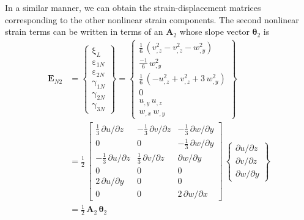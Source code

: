 In a similar manner, we can obtain the strain-displacement matrices corresponding to the other nonlinear strain components. The second nonlinear strain terms can be written in terms of an $\mathbf{A}_2$ whose slope vector $\boldsymbol{\theta}_2$ is
\begin{equation}
\begin{aligned}
\mathbf{E}_{N2} & =  \begin{Bmatrix}
\mathrm \xi_{L} \\
\mathrm \varepsilon_{1N} \\
\mathrm \varepsilon_{2N} \\
\mathrm \gamma_{1N} \\
\mathrm \gamma_{2N} \\
\mathrm \gamma_{3N} \end{Bmatrix} =
\begin{Bmatrix}
\tfrac{1}{6} \,  \left( v_{,z}^2 - v_{,z}^2 - w_{,y}^2  \right)\\
\tfrac{-1}{6} \, w_{,y}^2 \\
\tfrac{1}{6} \,  \left( - u_{,z}^2  + v_{,z}^2 + 3 \, w_{,y}^2 \right) \\
0 \\
u_{,y} \, u_{,z}  \\ 
w_{,x} \, w_{,y} \end{Bmatrix} \\
& = \frac{1}{2} \, \begin{bmatrix}
 \tfrac{1}{3} \, \partial u / \partial z &  - \tfrac{1}{3} \, \partial v / \partial z & - \tfrac{1}{3} \, \partial w / \partial y  \\
0 & 0 & - \tfrac{1}{3} \, \partial w / \partial y  \\
-\tfrac{1}{3} \, \partial u / \partial z  & \tfrac{1}{3} \, \partial v / \partial z & \partial w / \partial y \\
0 & 0 & 0  \\
2 \, \partial u / \partial y &  0 & 0 \\
0 &  0 &  2 \, \partial w / \partial x  \end{bmatrix} \, \begin{Bmatrix}
\partial u / \partial z\\
\partial v / \partial z \\
\partial w / \partial y
\end{Bmatrix} \\
& = \tfrac{1}{2} \, \mathbf{A}_2 \, \boldsymbol{\theta}_2
\end{aligned}
\end{equation}
